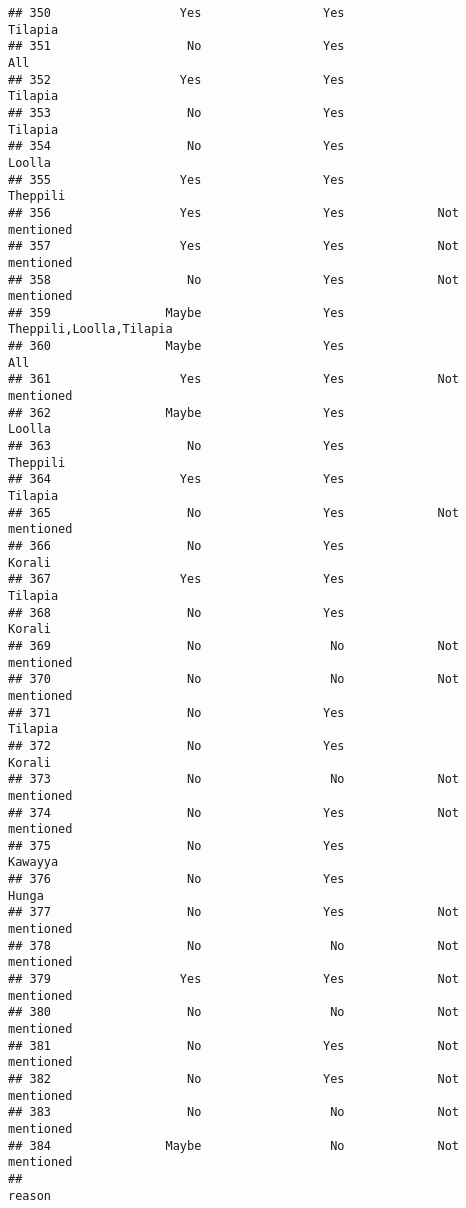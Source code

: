 \documentclass[
]{article}
\begin{document}
\begin{verbatim}
## 350                  Yes                 Yes                  Tilapia 
## 351                   No                 Yes                       All
## 352                  Yes                 Yes                  Tilapia 
## 353                   No                 Yes                  Tilapia 
## 354                   No                 Yes                   Loolla 
## 355                  Yes                 Yes                 Theppili 
## 356                  Yes                 Yes             Not mentioned
## 357                  Yes                 Yes             Not mentioned
## 358                   No                 Yes             Not mentioned
## 359                Maybe                 Yes  Theppili,Loolla,Tilapia 
## 360                Maybe                 Yes                       All
## 361                  Yes                 Yes             Not mentioned
## 362                Maybe                 Yes                   Loolla 
## 363                   No                 Yes                 Theppili 
## 364                  Yes                 Yes                  Tilapia 
## 365                   No                 Yes             Not mentioned
## 366                   No                 Yes                   Korali 
## 367                  Yes                 Yes                  Tilapia 
## 368                   No                 Yes                   Korali 
## 369                   No                  No             Not mentioned
## 370                   No                  No             Not mentioned
## 371                   No                 Yes                  Tilapia 
## 372                   No                 Yes                   Korali 
## 373                   No                  No             Not mentioned
## 374                   No                 Yes             Not mentioned
## 375                   No                 Yes                  Kawayya 
## 376                   No                 Yes                    Hunga 
## 377                   No                 Yes             Not mentioned
## 378                   No                  No             Not mentioned
## 379                  Yes                 Yes             Not mentioned
## 380                   No                  No             Not mentioned
## 381                   No                 Yes             Not mentioned
## 382                   No                 Yes             Not mentioned
## 383                   No                  No             Not mentioned
## 384                Maybe                  No             Not mentioned
##                                                                                                      reason

\end{verbatim}
\end{document}
